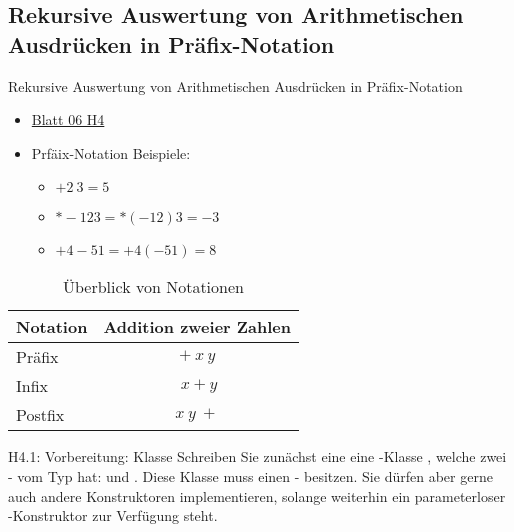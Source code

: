\documentclass{../tuda-beamer}
\begin{document}
    \subsection{Rekursive Auswertung von Arithmetischen Ausdrücken in Präfix-Notation}
    \begin{frame}{Rekursive Auswertung von Arithmetischen Ausdrücken in Präfix-Notation}
        \begin{itemize}
            \item \href{https://moodle.informatik.tu-darmstadt.de/pluginfile.php/202303/mod_resource/content/3/uebung06.pdf}{Blatt 06 H4}
            \item Prfäix-Notation Beispiele:
            \begin{itemize}
                \item \(+ 2 \ 3 = 5\)
                \item \(* - 1 2 3 = * (-1 2) 3 = - 3\)
                \item \(+ 4 - 5 1 = + 4 (- 5 1) = 8\)
            \end{itemize}
        \end{itemize}

        \begin{table}[h]
            \centering
            \begin{tabular}{lc}
                \toprule
                \textbf{Notation} & \textbf{Addition zweier Zahlen}
                \\
                \midrule
                Präfix & \(+ \ x \ y\)
                \\
                Infix & \(\ x + y\)
                \\
                Postfix & \(x \ y \ +\)
                \\
                \bottomrule
            \end{tabular}
            \caption{Überblick von Notationen}
        \end{table}
    \end{frame}

    \begin{frame}[c]{H4.1: Vorbereitung: Klasse }
        Schreiben Sie zunächst eine eine -Klasse
        , welche zwei
        - vom Typ  hat:
         und . Diese Klasse muss
        einen  - besitzen.
        Sie dürfen aber gerne auch andere Konstruktoren implementieren, solange weiterhin ein
        parameterloser -Konstruktor zur Verfügung steht.
    \end{frame}
\end{document}
